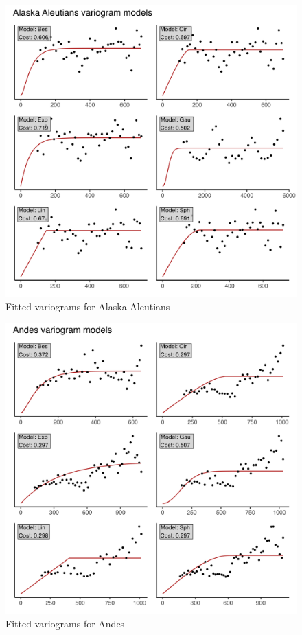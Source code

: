\begin{figure}
\centering
\includegraphics{assets/figs/chpt3/AlaskaAleutiansVgrms.png}
\caption[Fitted variograms for Alaska Aleutians]{Fitted variograms for Alaska Aleutians}
\end{figure}

\begin{figure}
\centering
\includegraphics{assets/figs/chpt3/AndesVgrms.png}
\caption[Fitted variograms for Andes]{Fitted variograms for Andes}
\end{figure}

